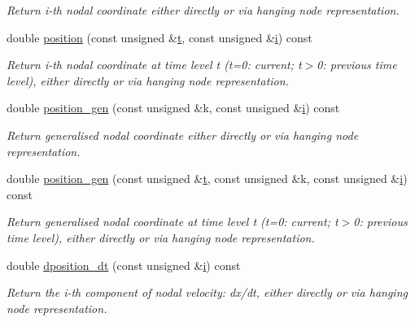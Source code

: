 \begin{DoxyCompactItemize}
\begin{DoxyCompactList}\small\item\em Return i-\/th nodal coordinate either directly or via hanging node representation. \end{DoxyCompactList}\item 
double \hyperlink{classoomph_1_1Node_a9110f050f09e803c37a4dde741ec249f}{position} (const unsigned \&\hyperlink{cfortran_8h_af6f0bd3dc13317f895c91323c25c2b8f}{t}, const unsigned \&\hyperlink{cfortran_8h_adb50e893b86b3e55e751a42eab3cba82}{i}) const
\begin{DoxyCompactList}\small\item\em Return i-\/th nodal coordinate at time level t (t=0\+: current; t$>$0\+: previous time level), either directly or via hanging node representation. \end{DoxyCompactList}\item 
double \hyperlink{classoomph_1_1Node_aa8974c69837b6909158054ecb70a64e2}{position\+\_\+gen} (const unsigned \&k, const unsigned \&\hyperlink{cfortran_8h_adb50e893b86b3e55e751a42eab3cba82}{i}) const
\begin{DoxyCompactList}\small\item\em Return generalised nodal coordinate either directly or via hanging node representation. \end{DoxyCompactList}\item 
double \hyperlink{classoomph_1_1Node_a56eb5caa6b0cbf91983e1a550de52d9f}{position\+\_\+gen} (const unsigned \&\hyperlink{cfortran_8h_af6f0bd3dc13317f895c91323c25c2b8f}{t}, const unsigned \&k, const unsigned \&\hyperlink{cfortran_8h_adb50e893b86b3e55e751a42eab3cba82}{i}) const
\begin{DoxyCompactList}\small\item\em Return generalised nodal coordinate at time level t (t=0\+: current; t$>$0\+: previous time level), either directly or via hanging node representation. \end{DoxyCompactList}\item 
double \hyperlink{classoomph_1_1Node_ad3d37ea1c80500645fa32cc43f1f29ce}{dposition\+\_\+dt} (const unsigned \&\hyperlink{cfortran_8h_adb50e893b86b3e55e751a42eab3cba82}{i}) const
\begin{DoxyCompactList}\small\item\em Return the i-\/th component of nodal velocity\+: dx/dt, either directly or via hanging node representation. \end{DoxyCompactList}\item 

\end{DoxyCompactItemize}
